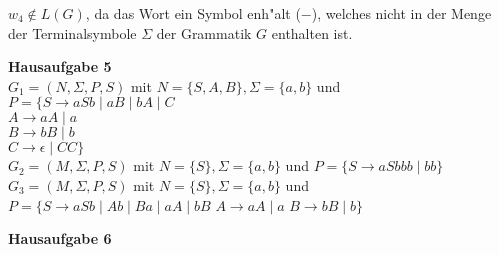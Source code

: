 \documentclass[a4paper,12pt]{article}
\newcommand{\Aufgabe}[1]{
        {
        \vspace*{0.5cm}
        \textbf{Hausaufgabe #1}
        \vspace*{0.2cm}
    }
}
\begin{document}
$ w_4 \notin L(G) $, da das Wort ein Symbol enh"alt ($ - $), welches nicht in der Menge der Terminalsymbole $ \Sigma $ der Grammatik $ G $ enthalten ist.

\Aufgabe{5} \\
$ G_1 = (N, \Sigma, P, S) $ mit $ N = \{S, A, B\}, \Sigma = \{a, b\} $ und \\
$ P = \{ S \rightarrow aSb \mid aB \mid bA \mid C$ \\
$A \rightarrow aA \mid a$ \\
$B \rightarrow bB \mid b$ \\
$C \rightarrow \epsilon \mid CC \} $ \\

$ G_2 = (M, \Sigma, P, S) $ mit $ N = \{S\}, \Sigma = \{a, b\} $ und 
$ P = \{S \rightarrow aSbbb \mid bb\} $ \\

$ G_3 = (M, \Sigma, P, S) $ mit $ N = \{S\}, \Sigma = \{a, b\} $ und \\
$ P = \{ S \rightarrow aSb \mid Ab \mid Ba \mid aA \mid bB $
$ A \rightarrow aA \mid a $
$ B \rightarrow bB \mid b \} $
\newpage

\Aufgabe{6}
\end{document}
